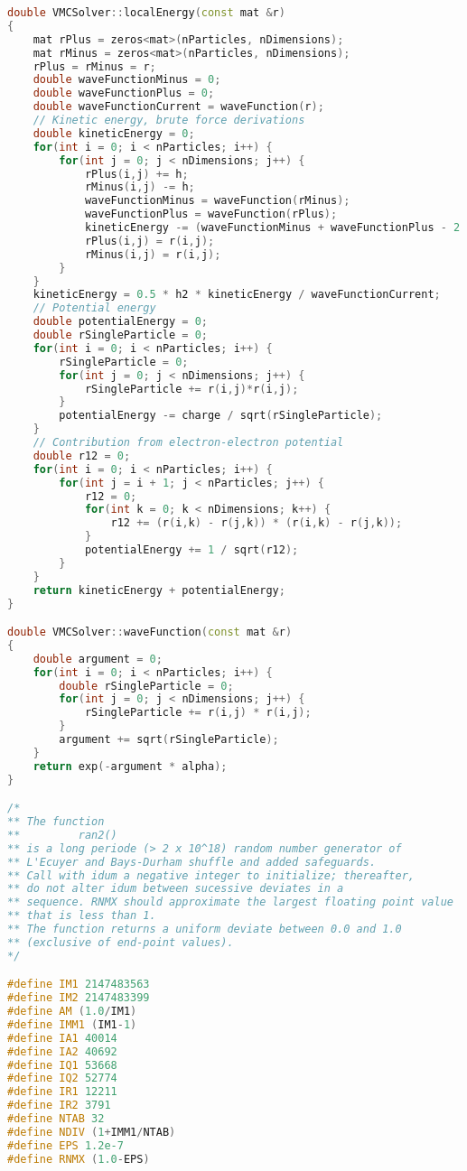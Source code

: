 \documentclass[graybox,sectrefs,envcountresetchap,open=right]{svmonodo}
\begin{document}
\begin{lstlisting}[language=C++,style=blue1]
double VMCSolver::localEnergy(const mat &r)
{
    mat rPlus = zeros<mat>(nParticles, nDimensions);
    mat rMinus = zeros<mat>(nParticles, nDimensions);
    rPlus = rMinus = r;
    double waveFunctionMinus = 0;
    double waveFunctionPlus = 0;
    double waveFunctionCurrent = waveFunction(r);
    // Kinetic energy, brute force derivations
    double kineticEnergy = 0;
    for(int i = 0; i < nParticles; i++) {
        for(int j = 0; j < nDimensions; j++) {
            rPlus(i,j) += h;
            rMinus(i,j) -= h;
            waveFunctionMinus = waveFunction(rMinus);
            waveFunctionPlus = waveFunction(rPlus);
            kineticEnergy -= (waveFunctionMinus + waveFunctionPlus - 2 * waveFunctionCurrent);
            rPlus(i,j) = r(i,j);
            rMinus(i,j) = r(i,j);
        }
    }
    kineticEnergy = 0.5 * h2 * kineticEnergy / waveFunctionCurrent;
    // Potential energy
    double potentialEnergy = 0;
    double rSingleParticle = 0;
    for(int i = 0; i < nParticles; i++) {
        rSingleParticle = 0;
        for(int j = 0; j < nDimensions; j++) {
            rSingleParticle += r(i,j)*r(i,j);
        }
        potentialEnergy -= charge / sqrt(rSingleParticle);
    }
    // Contribution from electron-electron potential
    double r12 = 0;
    for(int i = 0; i < nParticles; i++) {
        for(int j = i + 1; j < nParticles; j++) {
            r12 = 0;
            for(int k = 0; k < nDimensions; k++) {
                r12 += (r(i,k) - r(j,k)) * (r(i,k) - r(j,k));
            }
            potentialEnergy += 1 / sqrt(r12);
        }
    }
    return kineticEnergy + potentialEnergy;
}

double VMCSolver::waveFunction(const mat &r)
{
    double argument = 0;
    for(int i = 0; i < nParticles; i++) {
        double rSingleParticle = 0;
        for(int j = 0; j < nDimensions; j++) {
            rSingleParticle += r(i,j) * r(i,j);
        }
        argument += sqrt(rSingleParticle);
    }
    return exp(-argument * alpha);
}

/*
** The function
**         ran2()
** is a long periode (> 2 x 10^18) random number generator of
** L'Ecuyer and Bays-Durham shuffle and added safeguards.
** Call with idum a negative integer to initialize; thereafter,
** do not alter idum between sucessive deviates in a
** sequence. RNMX should approximate the largest floating point value
** that is less than 1.
** The function returns a uniform deviate between 0.0 and 1.0
** (exclusive of end-point values).
*/

#define IM1 2147483563
#define IM2 2147483399
#define AM (1.0/IM1)
#define IMM1 (IM1-1)
#define IA1 40014
#define IA2 40692
#define IQ1 53668
#define IQ2 52774
#define IR1 12211
#define IR2 3791
#define NTAB 32
#define NDIV (1+IMM1/NTAB)
#define EPS 1.2e-7
#define RNMX (1.0-EPS)


\end{lstlisting}
\end{document}
